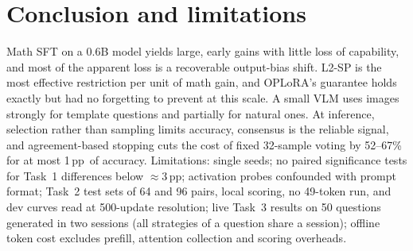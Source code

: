 \documentclass{article}
\newcommand{\pp}{\,pp}
\begin{document}
\section{Conclusion and limitations}
Math SFT on a 0.6B model yields large, early gains with little loss of capability, and most of the apparent loss is a recoverable output-bias shift. L2-SP is the most effective restriction per unit of math gain, and OPLoRA's guarantee holds exactly but had no forgetting to prevent at this scale. A small VLM uses images strongly for template questions and partially for natural ones. At inference, selection rather than sampling limits accuracy, consensus is the reliable signal, and agreement-based stopping cuts the cost of fixed 32-sample voting by 52--67\% for at most 1\pp\ of accuracy. Limitations: single seeds; no paired significance tests for Task~1 differences below $\approx$3\pp; activation probes confounded with prompt format; Task~2 test sets of 64 and 96 pairs, local scoring, no 49-token run, and dev curves read at 500-update resolution; live Task~3 results on 50 questions generated in two sessions (all strategies of a question share a session); offline token cost excludes prefill, attention collection and scoring overheads.
\end{document}
